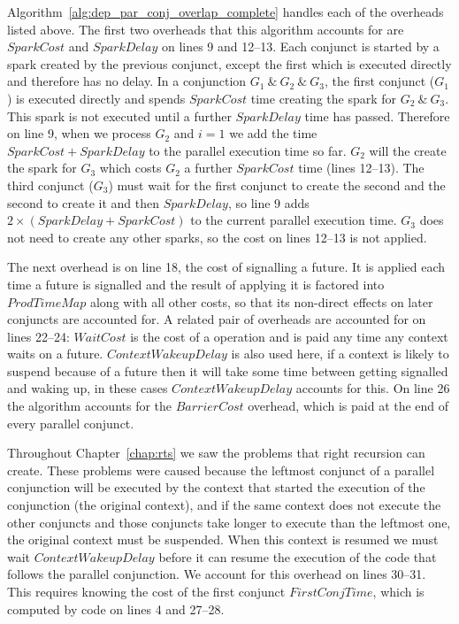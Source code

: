Algorithm~\ref{alg:dep_par_conj_overlap_complete} handles each of the
overheads listed above.
The first two overheads that this algorithm accounts for are
$SparkCost$ and $SparkDelay$ on lines 9 and 12--13.
Each conjunct is started by a spark created by the previous conjunct,
except the first which is executed directly and therefore has no delay.
In a conjunction $G_1~\&~G_2~\&~G_3$,
the first conjunct ($G_1$) is executed directly and spends
$SparkCost$ time creating the spark for $G_2~\&~G_3$.
This spark is not executed until a further $SparkDelay$ time has passed.
Therefore on line 9, when we process $G_2$ and $i = 1$ we add the time
$SparkCost + SparkDelay$ to the parallel execution time so far.
$G_2$ will the create the spark for $G_3$ which costs $G_2$ a further
$SparkCost$ time (lines 12--13).
The third conjunct ($G_3$) must wait for the first conjunct to create the
second and the second to create it and then $SparkDelay$,
so line 9 adds $2\times(SparkDelay + SparkCost)$ to the current parallel
execution time.
$G_3$ does not need to create any other sparks, so the cost on lines 12--13
is not applied.

The next overhead is on line 18, the cost of signalling a future.
It is applied each time a future is signalled and the result of applying it
is factored into $ProdTimeMap$ along with all other costs,
so that its non-direct effects on later conjuncts are accounted for.
A related pair of overheads are accounted for on lines 22--24:
$WaitCost$ is the cost of a \wait operation and is paid any time any context
waits on a future.
$ContextWakeupDelay$ is also used here, if a context is likely to suspend
because of a future then it will take some time between getting signalled and
waking up,
in these cases $ContextWakeupDelay$ accounts for this.
On line 26 the algorithm accounts for the $BarrierCost$ overhead,
which is paid at the end of every parallel conjunct.

Throughout Chapter~\ref{chap:rts} we saw the problems that right recursion
can create.
These problems were caused because the leftmost conjunct of a parallel
conjunction will be executed by the context that started the execution of
the conjunction (the original context),
and if the same context does not execute the other conjuncts and those
conjuncts take longer to execute than the leftmost one,
the original context must be suspended.
When this context is resumed we must wait $ContextWakeupDelay$ before it can
resume the execution of the code that follows the parallel conjunction.
We account for this overhead on lines 30--31.
This requires knowing the cost of the first conjunct $FirstConjTime$,
which is computed by code on lines 4 and 27--28.

